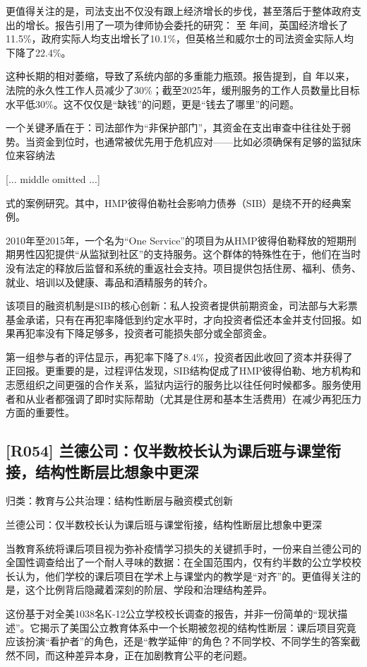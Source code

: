 \documentclass[11pt]{ctexart}
\begin{document}
更值得关注的是，司法支出不仅没有跟上经济增长的步伐，甚至落后于整体政府支出的增长。报告引用了一项为律师协会委托的研究： 至 年间，英国经济增长了11.5\%，政府实际人均支出增长了10.1\%，但英格兰和威尔士的司法资金实际人均下降了22.4\%。

这种长期的相对萎缩，导致了系统内部的多重能力瓶颈。报告提到，自 年以来，法院的永久性工作人员减少了30\%；截至2025年，缓刑服务的工作人员数量比目标水平低30\%。这不仅仅是“缺钱”的问题，更是“钱去了哪里”的问题。

一个关键矛盾在于：司法部作为“非保护部门”，其资金在支出审查中往往处于弱势。当资金到位时，也通常被优先用于危机应对——比如必须确保有足够的监狱床位来容纳法

[... middle omitted ...]

式的案例研究。其中，HMP彼得伯勒社会影响力债券（SIB）是绕不开的经典案例。

2010年至2015年，一个名为“One Service”的项目为从HMP彼得伯勒释放的短期刑期男性囚犯提供“从监狱到社区”的支持服务。这个群体的特殊性在于，他们在当时没有法定的释放后监督和系统的重返社会支持。项目提供包括住房、福利、债务、就业、培训以及健康、毒品和酒精服务的转介。

该项目的融资机制是SIB的核心创新：私人投资者提供前期资金，司法部与大彩票基金承诺，只有在再犯率降低到约定水平时，才向投资者偿还本金并支付回报。如果再犯率没有下降足够多，投资者可能损失部分或全部资金。

第一组参与者的评估显示，再犯率下降了8.4\%，投资者因此收回了资本并获得了正回报。更重要的是，过程评估发现，SIB结构促成了HMP彼得伯勒、地方机构和志愿组织之间更强的合作关系，监狱内运行的服务比以往任何时候都多。服务使用者和从业者都强调了即时实际帮助（尤其是住房和基本生活费用）在减少再犯压力方面的重要性。

\subsection{[R054] 兰德公司：仅半数校长认为课后班与课堂衔接，结构性断层比想象中更深}
{\small\color{refgray}归类：教育与公共治理：结构性断层与融资模式创新}

兰德公司：仅半数校长认为课后班与课堂衔接，结构性断层比想象中更深

当教育系统将课后项目视为弥补疫情学习损失的关键抓手时，一份来自兰德公司的全国性调查给出了一个耐人寻味的数据：在全国范围内，仅有约半数的公立学校校长认为，他们学校的课后项目在学术上与课堂内的教学是“对齐”的。更值得关注的是，这个比例背后隐藏着深刻的阶层、学段和治理结构差异。

这份基于对全美1038名K-12公立学校校长调查的报告，并非一份简单的“现状描述”。它揭示了美国公立教育体系中一个长期被忽视的结构性断层：课后项目究竟应该扮演“看护者”的角色，还是“教学延伸”的角色？不同学校、不同学生的答案截然不同，而这种差异本身，正在加剧教育公平的老问题。
\end{document}
